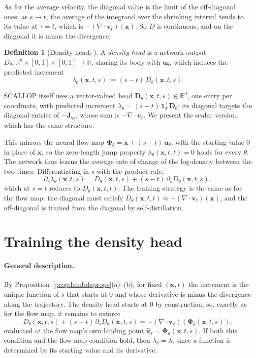 \documentclass[11pt,a4paper]{article}
\numberwithin{equation}{section}     %
\theoremstyle{plain}        %
\theoremstyle{definition}   %
\newtheorem{definition}[theorem]{Definition}
\theoremstyle{remark}       %
\begin{document}
As for the average velocity, the diagonal value is the limit of the off-diagonal ones: as $s\to t$, the average of the integrand over the shrinking interval tends to its value at $\tau=t$, which is $-(\nabla\cdot\mathbf{v}_t)(\mathbf{x})$. So $D$ is continuous, and on the diagonal it is minus the divergence.

\begin{definition}[Density head; \citealp{ai2026,ouyang2026}]\label{def:densityhead}
A \emph{density head} is a network output $D_\theta:\mathbb{R}^d\times[0,1]\times[0,1]\to\mathbb{R}$, sharing its body with $\mathbf{u}_\theta$, which induces the predicted increment
\[
\lambda_\theta(\mathbf{x},t,s):=(s-t)\,D_\theta(\mathbf{x},t,s).
\]
\end{definition}

SCALLOP itself uses a vector-valued head $\mathbf{D}_\theta(\mathbf{x},t,s)\in\mathbb{R}^d$, one entry per coordinate, with predicted increment $\lambda_\theta=(s-t)\,\mathbf{1}_d^\top\mathbf{D}_\theta$; its diagonal targets the diagonal entries of $-\mathbf{J}_{\mathbf{v}_t}$, whose sum is $-\nabla\cdot\mathbf{v}_t$. We present the scalar version, which has the same structure.

This mirrors the neural flow map $\boldsymbol{\Phi}_\theta=\mathbf{x}+(s-t)\,\mathbf{u}_\theta$, with the starting value $0$ in place of $\mathbf{x}$, so the zero-length jump property $\lambda_\theta(\mathbf{x},t,t)=0$ holds for every $\theta$. The network thus learns the average rate of change of the log-density between the two times. Differentiating in $s$ with the product rule,
\[
\partial_s\lambda_\theta(\mathbf{x},t,s)=D_\theta(\mathbf{x},t,s)+(s-t)\,\partial_sD_\theta(\mathbf{x},t,s),
\]
which at $s=t$ reduces to $D_\theta(\mathbf{x},t,t)$. The training strategy is the same as for the flow map: the diagonal must satisfy $D_\theta(\mathbf{x},t,t)\approx-(\nabla\cdot\mathbf{v}_t)(\mathbf{x})$, and the off-diagonal is trained from the diagonal by self-distillation.

\section{Training the density head}\label{sec:traindensity}

\paragraph{General description.} By Proposition~\ref{prop:lambdaprops}(a)--(b), for fixed $(\mathbf{x},t)$ the increment is the unique function of $s$ that starts at $0$ and whose derivative is minus the divergence along the trajectory. The density head starts at $0$ by construction, so, exactly as for the flow map, it remains to enforce
\[
D_\theta(\mathbf{x},t,s)+(s-t)\,\partial_sD_\theta(\mathbf{x},t,s)=-\left(\nabla\cdot\mathbf{v}_s\right)\left(\boldsymbol{\Phi}_\theta(\mathbf{x},t,s)\right),
\]
evaluated at the flow map's own landing point $\hat{\mathbf{x}}_s=\boldsymbol{\Phi}_\theta(\mathbf{x},t,s)$. If both this condition and the flow map condition hold, then $\lambda_\theta=\lambda$, since a function is determined by its starting value and its derivative.
\end{document}
